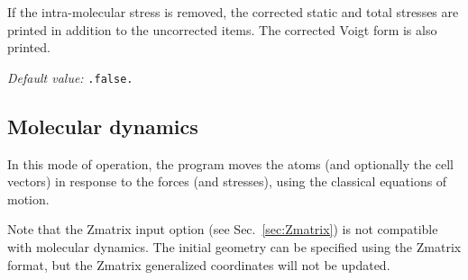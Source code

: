 \begin{description}
If the intra-molecular stress is removed, the corrected static and
total stresses are printed in addition to the uncorrected items.
The corrected Voigt form is also printed.

\textit{Default value:} \texttt{.false.}
\end{description}


\subsection{Molecular dynamics}

In this mode of operation, the program moves the atoms (and optionally
the cell vectors) in response to the forces (and stresses), using the
classical equations of motion.

Note that the Zmatrix input option (see Sec.~\ref{sec:Zmatrix}) is not
compatible with molecular dynamics. The initial geometry can be
specified using the Zmatrix format, but the Zmatrix generalized
coordinates will not be updated.

